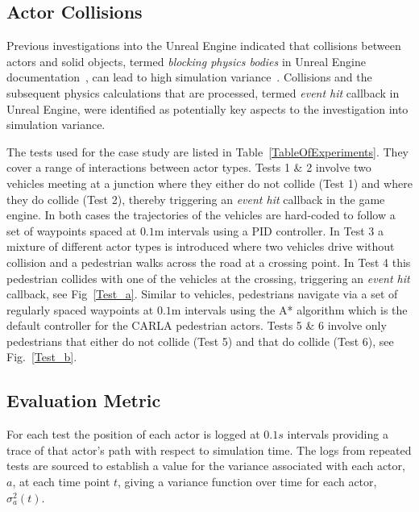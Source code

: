 \documentclass[letterpaper, 10 pt, journal, twoside]{IEEEtran}
\begin{document}
\subsection{Actor Collisions}\label{S:Actor_Collisions}
Previous investigations into the Unreal Engine indicated that collisions between actors and solid objects, termed \textit{blocking physics bodies} in Unreal Engine documentation~\cite{collision_overview}, can lead to high simulation variance~\cite{TSLUnrealEngineTesting}. 
%
Collisions and the subsequent physics calculations that are processed, termed \textit{event hit} callback in Unreal Engine, were identified as potentially key aspects to the investigation into simulation variance.

The tests used for the case study are listed in Table~\ref{TableOfExperiments}. They cover a range of interactions between actor types. 
%
Tests 1 \& 2 involve two vehicles meeting at a junction where they either do not collide (Test 1) and where they do collide (Test 2), thereby triggering an \textit{event hit} callback in the game engine. In both cases the trajectories of the vehicles are hard-coded to follow a set of waypoints spaced at $0.1$m 
intervals using a PID controller. 
%
In Test 3 a mixture of different actor types is introduced where two vehicles drive without collision and a pedestrian walks across the road at a crossing point. 
%
In Test 4 this pedestrian collides with one of the vehicles at the crossing, triggering an \textit{event hit} callback, see Fig~\ref{Test_a}. Similar to vehicles, pedestrians navigate via a set of regularly spaced waypoints at $0.1$m intervals using the A* algorithm which is the default controller for the CARLA pedestrian actors. Tests 5 \& 6 involve only pedestrians that either do not collide (Test 5) and that do collide (Test 6), see Fig.~\ref{Test_b}. 




\subsection{Evaluation Metric}\label{s:Experiment_Description}
For each test the position of each actor is logged at $0.1s$ intervals providing a trace of that actor's path with respect to simulation time. 
%
The logs from repeated tests are sourced to establish a value for the variance associated with each actor, $a$, at each time point $t$, giving a variance function over time for each actor, $\sigma_a^{2}(t)$.
\end{document}
